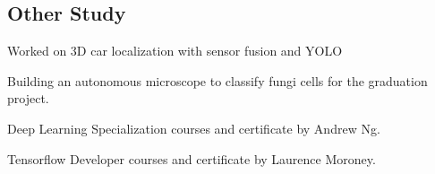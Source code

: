 \documentclass[letter, 14pt]{article}
\begin{document}


\subsection{Other Study}
\subtext{}
\begin{zitemize}
\item Worked on 3D car localization with sensor fusion and YOLO 
 \href{https://www.youtube.com/watch?v=FBLalZQ7VFo}{\color{black}\externallink}
\item Building an autonomous microscope to classify fungi cells for the graduation project.
\href{https://github.com/denizberkin/grad-project-without-database}{\color{black}\externallink}
\item Deep Learning Specialization courses and certificate by Andrew Ng. 
\href{https://www.coursera.org/account/accomplishments/specialization/certificate/WNJCS69WKCQ8}{\color{black}\externallink}
\item Tensorflow Developer courses and certificate by Laurence Moroney. 
\href{https://www.coursera.org/account/accomplishments/specialization/certificate/3WKMBQ8CVFY4}{\color{black}\externallink}
\end{zitemize}
\end{document}
